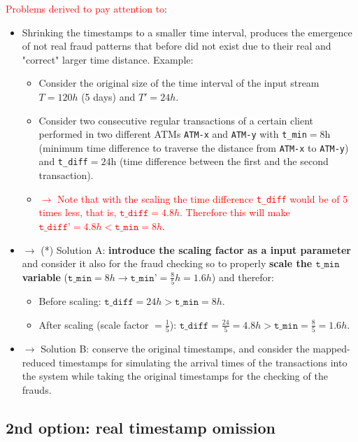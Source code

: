\documentclass{article}
\begin{document}
\textcolor{red}{Problems derived to pay attention to}:
\begin{itemize}
  \item Shrinking the timestamps to a smaller time interval, produces the emergence of not real fraud patterns that before did not exist due to their real and "correct" larger time distance. Example:
  \begin{itemize}
  \item Consider the original size of the time interval of the input stream $T=120h$ (5 days) and $T'=24h$.
  \item Consider two consecutive regular transactions of a certain client performed in two different ATMs \texttt{ATM-x} and \texttt{ATM-y} with \texttt{t\_min}$=8$h (minimum time difference to traverse the distance from \texttt{ATM-x} to \texttt{ATM-y}) and \texttt{t\_diff}$=24$h (time difference between the first and the second transaction). 
  \item \textcolor{red}{$\rightarrow$ Note that with the scaling the time difference \texttt{t\_diff} would be of 5 times less, that is, $\texttt{t\_diff}=4.8h$. Therefore this will make $\texttt{t\_diff'}=4.8h < \texttt{t\_min}=8h$}.
  \end{itemize}
  \item $\rightarrow$ (*) Solution A: \textbf{introduce the scaling factor as a input parameter} and consider it also for the fraud checking so to properly \textbf{scale the $\texttt{t\_min}$ variable} ($\texttt{t\_min}=8h \rightarrow \texttt{t\_min'}=\frac{8}{5}h=1.6h$) and therefor: 
  \begin{itemize}
    \item Before scaling: $\texttt{t\_diff}=24h > \texttt{t\_min}=8h$.
    \item After scaling (scale factor $=\frac{1}{5}$): $\texttt{t\_diff}=\frac{24}{5}=4.8h > \texttt{t\_min}=\frac{8}{5}=1.6h$.
  \end{itemize}
  \item $\rightarrow$ Solution B: conserve the original timestamps, and consider the mapped-reduced timestamps for simulating the arrival times of the transactions into the system while taking the original timestamps for the checking of the frauds.
\end{itemize}



\subsection{2nd option: real timestamp omission}
\end{document}
